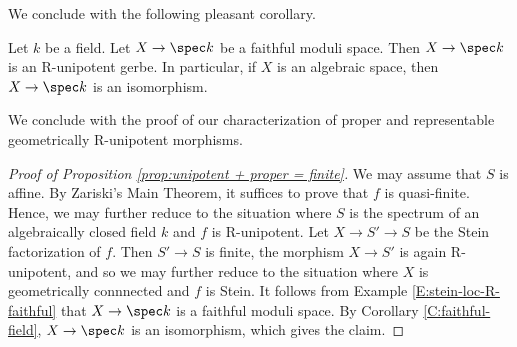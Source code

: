 \documentclass[reqno,a4paper]{amsart}
\numberwithin{Theorem}{section}
\theoremstyle{plain}
\theoremstyle{remark}
\begin{document}
 We conclude with the following pleasant corollary.
\begin{corollary}\label{C:faithful-field}
  Let $k$ be a field. Let $X \to \spec k$ be a faithful moduli
  space. Then $X \to \spec k$ is an R-unipotent gerbe. In particular,
  if $X$ is an algebraic space, then $X \to \spec k$ is an
  isomorphism.
\end{corollary}
We conclude with the proof of our characterization of proper and
representable geometrically R-unipotent morphisms.
\begin{proof}[Proof of Proposition \ref{prop:unipotent + proper = finite}]
  We may assume that $S$ is affine. By Zariski's Main Theorem, it
  suffices to prove that $f$ is quasi-finite. Hence, we may further
  reduce to the situation where $S$ is the spectrum of an
  algebraically closed field $k$ and $f$ is R-unipotent. Let
  $X\to S'\to S$ be the Stein factorization of $f$. Then $S' \to S$ is
  finite, the morphism $X\to S'$ is again R-unipotent, and so we may
  further reduce to the situation where $X$ is geometrically
  connnected and $f$ is Stein. It follows from Example
  \ref{E:stein-loc-R-faithful} that $X \to \spec k$ is a faithful
  moduli space. By Corollary \ref{C:faithful-field}, $X \to \spec k$
  is an isomorphism, which gives the claim.
\end{proof}


\end{document}
